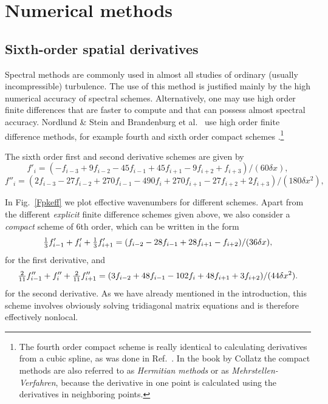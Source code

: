 \documentclass[\mydriver,12pt,twoside,notitlepage,a4paper]{article}
\begin{document}
\section{Numerical methods}

\subsection{Sixth-order spatial derivatives}
\label{S-6th-order}

Spectral methods are commonly used in almost all studies of ordinary
(usually incompressible) turbulence. The use of this method is justified
mainly by the high numerical accuracy of spectral schemes. Alternatively,
one may use high order finite differences that are faster to compute
and that can possess almost spectral accuracy.  Nordlund \& Stein \cite{NS90}
and Brandenburg et al.\ \cite{BNST95} use high order finite difference
methods, for example fourth and sixth order compact schemes
\cite{Lele92}.\footnote{The fourth order compact scheme is really identical to
calculating derivatives from a cubic spline, as was done in Ref.~\cite{NS90}.
In the book by Collatz \cite{Collatz66} the compact methods are also
referred to as {\it Hermitian methods} or as {\it Mehrstellen-Verfahren},
because the derivative in one point is calculated using the derivatives
in neighboring points.}

The sixth order first and second derivative schemes are given by
\begin{equation}
f'_i=(-f_{i-3}+9f_{i-2}-45f_{i-1}
+45f_{i+1}-9f_{i+2}+f_{i+3})/(60\delta x),
\end{equation}
\begin{equation}
f''_i=(2f_{i-3}-27f_{i-2}+270f_{i-1}-490f_i
+270f_{i+1}-27f_{i+2}+2f_{i+3})/(180\delta x^2),
\end{equation}

In Fig.~\ref{Fpkeff} we plot effective wavenumbers for different schemes.
Apart from the different {\it explicit} finite difference schemes
given above, we also consider a {\it compact} scheme of 6th order,
which can be written in the form
\begin{equation}
{\textstyle{1\over3}}f'_{i-1}+f'_i+{\textstyle{1\over3}}f'_{i+1}
=(f_{i-2}-28f_{i-1}+28f_{i+1}-f_{i+2})/(36\delta x),
\end{equation}
for the first derivative, and
\begin{equation}
{\textstyle{2\over11}}f''_{i-1}+f''_i+{\textstyle{2\over11}}f''_{i+1}
=(3f_{i-2}+48f_{i-1}-102f_i+48f_{i+1}+3f_{i+2})/(44\delta x^2).
\end{equation}
for the second derivative. As we have already mentioned in the introduction, this
scheme involves obviously solving tridiagonal matrix equations and is
therefore effectively nonlocal.
\end{document}
